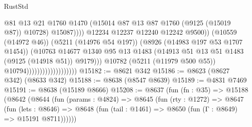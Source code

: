 \begin{lexlean}{RustStd}
\begin{coremodule}
                                                        @81
                                                        @13
                                                        @21
                                                        @1760
                                                        @1470
                                                        (@15014
                                                          @87
                                                          @13
                                                          @87
                                                          @1760
                                                          (@9125 (@15019 @87))
                                                          @10728)
                                                        @15087))))
                                                @12234
                                                @12237
                                                @12240
                                                @12242
                                                @9500))
                                            (@10559 (@14972 @46))
                                            (@5211 (@14976 @54 @197))
                                            (@8926 (@14983 @197 @53 @1707 @1454))
                                            (@10763
                                              @14677
                                              @1340
                                              @95
                                              @13
                                              @1483
                                              (@14913
                                                @51
                                                @13
                                                @51
                                                @1483
                                                (@9125 (@14918 @51))
                                                @9179)))
                                          @10782
                                          (@5211 (@11979 @500 @55))
                                          @10794)))))))))))))))))))
@15182 := @8621 @342
@15186 := @8623 (@8627 @342) (@8633 @342)
@15188 := @8638 (@8547 @8639)
@15189 := @4831 @7469
@15191 := @8638 (@15189 @8666)
@15208 := @8637
    (fun (fn : @35) =>
    @15188
      (@8642
        (@8644
          (fun (params : @4824) =>
          @8645
            (fun (rty : @1272) =>
            @8647
              (fun (lets : @8646) =>
              @8648 (fun (tail : @1461) => @8650 (fun (Γ : @8649) => @15191 @8711))))))

\end{coremodule}
\end{lexlean}
